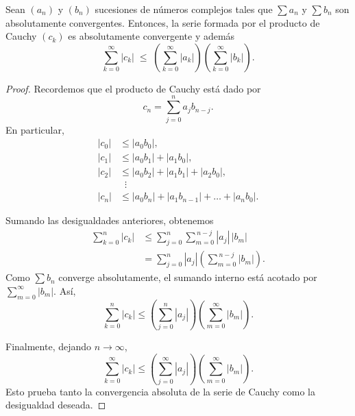 \begin{proposition}
    Sean $(a_n)$ y $(b_n)$ sucesiones de números complejos tales que 
    $\sum a_n$ y $\sum b_n$ son absolutamente convergentes. 
    Entonces, la serie formada por el producto de Cauchy $(c_k)$ es absolutamente convergente y además
    \begin{equation*}
        \sum_{k=0}^\infty |c_k| \;\leq\;
        \left( \sum_{k=0}^\infty |a_k| \right)
        \left( \sum_{k=0}^\infty |b_k| \right).
    \end{equation*}
\end{proposition}

\begin{proof}
    Recordemos que el producto de Cauchy está dado por
    \begin{equation*}
        c_n = \sum_{j=0}^n a_j b_{n-j}.
    \end{equation*}
    En particular,
    \begin{align*}
        |c_0| &\leq |a_0 b_0|, \\
        |c_1| &\leq |a_0 b_1| + |a_1 b_0|, \\
        |c_2| &\leq |a_0 b_2| + |a_1 b_1| + |a_2 b_0|, \\
              &\;\;\vdots \\
        |c_n| &\leq |a_0 b_n| + |a_1 b_{n-1}| + \dots + |a_n b_0|.
    \end{align*}

    Sumando las desigualdades anteriores, obtenemos
    \begin{align*}
        \sum_{k=0}^n |c_k|
        &\leq \sum_{j=0}^n \sum_{m=0}^{\,n-j} |a_j|\,|b_m| \\
        &= \sum_{j=0}^n |a_j| \left( \sum_{m=0}^{\,n-j} |b_m| \right).
    \end{align*}
    Como $\sum b_n$ converge absolutamente, el sumando interno está acotado por
    $\sum_{m=0}^\infty |b_m|$. Así,
    \begin{equation*}
        \sum_{k=0}^n |c_k|
        \leq \left(\sum_{j=0}^n |a_j|\right) \left(\sum_{m=0}^\infty |b_m|\right).
    \end{equation*}

    Finalmente, dejando $n \to \infty$,
    \begin{equation*}
        \sum_{k=0}^\infty |c_k|
        \leq \left(\sum_{j=0}^\infty |a_j|\right)\left(\sum_{m=0}^\infty |b_m|\right).
    \end{equation*}
    Esto prueba tanto la convergencia absoluta de la serie de Cauchy como la desigualdad deseada.
\end{proof}

